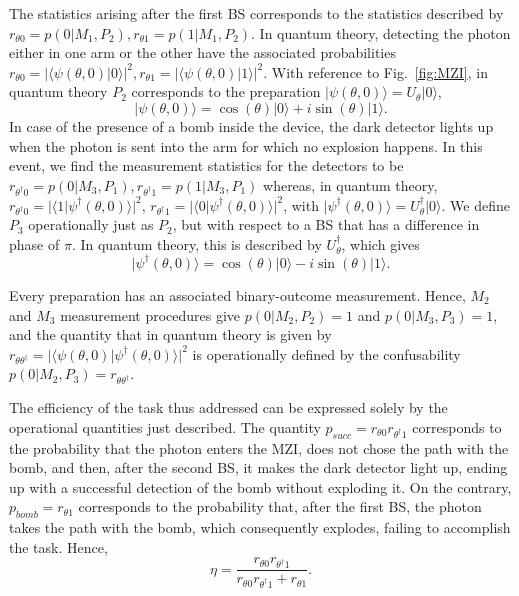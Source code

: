 \documentclass[a4paper,twocolumn,11pt,accepted=2024-01-17]{quantumarticle}
\begin{document}
The statistics arising after the first BS corresponds to the statistics described by $r_{\theta 0} = p(0 \vert M_1,P_2), r_{\theta 1}=p(1\vert M_1,P_2)$. In quantum theory, { detecting the photon either in one arm or the other have the  associated probabilities} $r_{\theta 0}= \vert \langle \psi(\theta,0) \vert 0 \rangle \vert^2, r_{\theta 1} = \vert \langle \psi (\theta,0) \vert 1 \rangle \vert^2$. With reference to Fig.~\ref{fig:MZI}, in quantum theory $P_2$ corresponds to the preparation $\vert \psi(\theta,0)\rangle = U_\theta \vert 0 \rangle$, 
\begin{equation}\label{eq: preparation state bomb}
    \vert \psi(\theta,0)\rangle = \cos(\theta)\vert 0 \rangle + i\sin(\theta)\vert 1 \rangle. 
\end{equation}
In case of the presence of a bomb inside the device, the dark detector lights up when the photon is sent into the arm for which no explosion happens. In this event, we find the measurement statistics for the detectors to be $r_{\theta^\dagger 0} = p(0\vert M_3, P_1),r_{\theta^\dagger 1} = p(1\vert M_3, P_1) $ whereas, in quantum theory, $r_{\theta^\dagger 0} = \vert \langle 1 \vert \psi^\dagger(\theta,0)\rangle \vert^2$, $r_{\theta^\dagger 1} = \vert \langle 0 \vert \psi^\dagger(\theta,0)\rangle \vert^2$, with $\vert \psi^\dagger(\theta,0) \rangle = U_\theta^\dagger \vert 0 \rangle $. We define $P_3$ operationally just as $P_2$, but with respect to a BS that has a difference in phase of $\pi$. In quantum theory, this is described by $U_\theta^\dagger$, which gives
\begin{equation}\label{eq: detection state}
    \vert \psi^\dagger(\theta,0) \rangle = \cos(\theta)\vert 0 \rangle - i\sin(\theta)\vert 1 \rangle.
\end{equation}

Every preparation has an associated binary-outcome measurement.  Hence, $M_2$ and $M_3$ measurement procedures give $p(0 \vert M_2, P_2) = 1$ and $p(0 \vert M_3, P_3) = 1$, and the quantity that in quantum theory is given by $r_{\theta \theta^\dagger} = \vert \langle \psi (\theta,0) \vert \psi^\dagger(\theta,0) \rangle \vert^2$ is operationally defined by the confusability $p(0 \vert M_2,P_3) = r_{\theta \theta^\dagger}$. 


The efficiency of the task thus addressed can be expressed solely by the operational quantities just described. The quantity $p_{succ} = r_{\theta 0}r_{\theta^\dagger 1}$ corresponds to the probability that the photon enters the MZI, does not chose the path with the bomb, and then, after the second BS, it makes the dark detector light up, ending up with a successful detection of the bomb without exploding it. On the contrary, $p_{bomb} = r_{\theta 1}$ corresponds to the probability that, after the first BS, the photon takes the path with the bomb, which consequently explodes, failing to accomplish the task. Hence,
\begin{equation}\label{eq: operational efficiency}
    \eta = \frac{r_{\theta 0}r_{\theta^\dagger 1}}{r_{\theta 0}r_{\theta^\dagger 1}+r_{\theta 1}}.
\end{equation}
\end{document}
